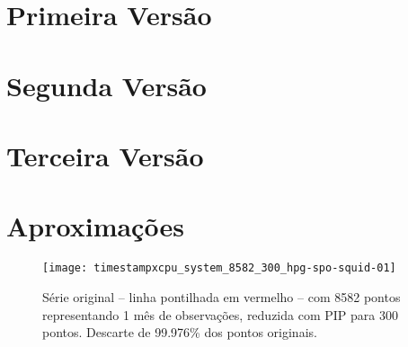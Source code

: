\lstset{ %
language=[Auto]Lisp,
basicstyle=\footnotesize,
frame=single,
numbers=left,
breaklines=true,
framerule=0.4mm,
showstringspaces=false}

\begin{appendices}
  \chapter{Primeira Versão}
  \label{chap:versao1}
  

  \chapter{Segunda Versão}
  \label{chap:versao2}
  

  \chapter{Terceira Versão}
  \label{chap:versao3}
  

  \chapter{Aproximações}
  \label{chap:aproximacao}
  \begin{figure}[htb!]
    \begin{center}
      \texttt{[image: timestampxcpu\_system\_8582\_300\_hpg-spo-squid-01]}
      \centering
      \caption[Série original com 8582 pontos reduzida com PIP para 300 pontos]{Série original -- linha pontilhada em vermelho -- com 8582 pontos representando 1 mês de observações, reduzida com PIP para 300 pontos. Descarte de 99.976\% dos pontos originais.}
    \label{fig:approx1}
    \end{center}
  \end{figure}

\end{appendices}
